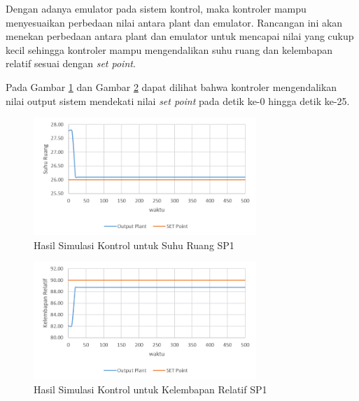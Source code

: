 Dengan adanya emulator pada sistem kontrol, maka kontroler mampu menyesuaikan perbedaan nilai antara plant dan emulator. Rancangan ini akan menekan perbedaan antara plant dan emulator untuk mencapai nilai yang cukup kecil sehingga kontroler mampu mengendalikan suhu ruang dan kelembapan relatif sesuai dengan \textit{set point}.

Pada Gambar \ref{fig:5:SimulinkSP1Td} dan Gambar \ref{fig:5:SimulinkSP1RH} dapat dilihat bahwa kontroler mengendalikan nilai output sistem mendekati nilai \textit{set point} pada detik ke-0 hingga detik ke-25.

\begin{figure}[!h]
	\centering
	\includegraphics[width=0.75\textwidth]{figures/SimulinkSP1Td}
	\caption{Hasil Simulasi Kontrol untuk Suhu Ruang SP1}
	\label{fig:5:SimulinkSP1Td}
\end{figure}

\begin{figure}[!h]
	\centering
	\includegraphics[width=0.75\textwidth]{figures/SimulinkSP1RH}
	\caption{Hasil Simulasi Kontrol untuk Kelembapan Relatif SP1}
	\label{fig:5:SimulinkSP1RH}
\end{figure}



